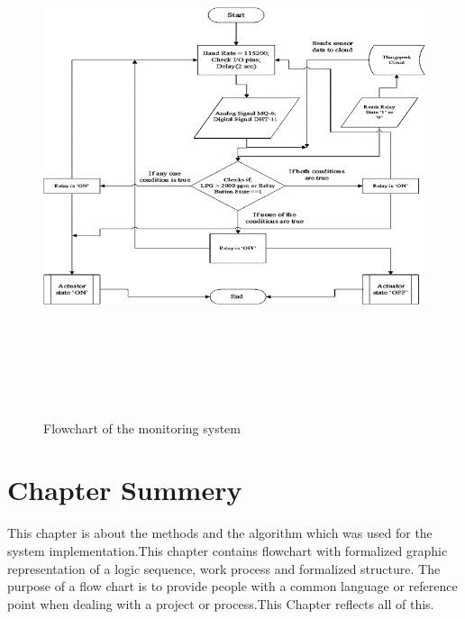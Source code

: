 \begin{figure}
  \centering
  \includegraphics[width=6in,height=6in]{13}
  \caption{Flowchart of the monitoring system}\label{fig13}
\end{figure}
\section{Chapter Summery}
This chapter is about the methods and the algorithm which was used for the system implementation.This chapter contains flowchart with formalized graphic representation of a logic sequence, work process and formalized structure. The purpose of a flow chart is to provide people with a common language or reference point when dealing with a project or process.This Chapter reflects all of this.    